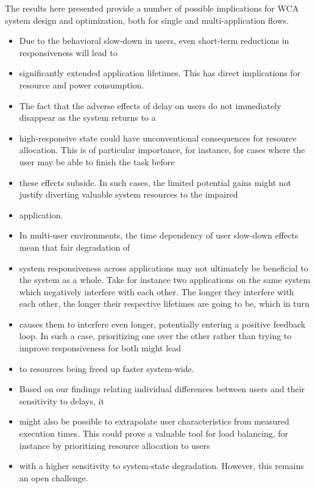 The results here presented provide a number of possible implications for WCA system design and optimization, both for
single and multi-application flows.

\begin{itemize}

    \item Due to the behavioral slow-down in users, even short-term reductions in responsiveness will lead to
    \item significantly extended application lifetimes.
    This has direct implications for resource and power consumption.

    \item The fact that the adverse effects of delay on users do not immediately disappear as the system returns to a
    \item high-responsive state could have unconventional consequences for resource allocation.
    This is of particular importance, for instance, for cases where the user may be able to finish the task before
    \item these effects subside.
    In such cases, the limited potential gains might not justify diverting valuable system resources to the impaired
    \item application.

    \item In multi-user environments, the time dependency of user slow-down effects mean that fair degradation of
    \item system responsiveness across applications may not ultimately be beneficial to the system as a whole.
    Take for instance two applications on the same system which negatively interfere with each other.
    The longer they interfere with each other, the longer their respective lifetimes are going to be, which in turn
    \item causes them to interfere even longer, potentially entering a positive feedback loop.
    In such a case, prioritizing one over the other rather than trying to improve responsiveness for both might lead
    \item to resources being freed up faster system-wide.

    \item Based on our findings relating individual differences between users and their sensitivity to delays, it
    \item might also be possible to extrapolate user characteristics from measured execution times.
    This could prove a valuable tool for load balancing, for instance by prioritizing resource allocation to users
    \item with a higher sensitivity to system-state degradation.
    However, this remains an open challenge.

\end{itemize}

